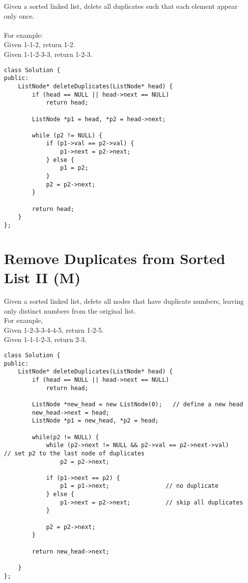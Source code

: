 Given a sorted linked list, delete all duplicates such that each element appear only once.\\ \\
For example: \\
Given 1-1-2, return 1-2. \\
Given 1-1-2-3-3, return 1-2-3. \\

\begin{lstlisting}
class Solution {
public:
    ListNode* deleteDuplicates(ListNode* head) {
        if (head == NULL || head->next == NULL)
            return head;
        
        ListNode *p1 = head, *p2 = head->next;
        
        while (p2 != NULL) {
            if (p1->val == p2->val) {
                p1->next = p2->next; 
            } else {
                p1 = p2;
            }
            p2 = p2->next;
        }
        
        return head;
    }
};
\end{lstlisting}


\section{Remove Duplicates from Sorted List II (M)}
Given a sorted linked list, delete all nodes that have duplicate numbers, leaving only distinct numbers from the original list.\\

For example,\\
Given 1-2-3-3-4-4-5, return 1-2-5.\\
Given 1-1-1-2-3, return 2-3. \\

\begin{lstlisting}
class Solution {
public:
    ListNode* deleteDuplicates(ListNode* head) {
        if (head == NULL || head->next == NULL)
            return head;
        
        ListNode *new_head = new ListNode(0);   // define a new head
        new_head->next = head;
        ListNode *p1 = new_head, *p2 = head;
        
        while(p2 != NULL) {
            while (p2->next != NULL && p2->val == p2->next->val)		// set p2 to the last node of duplicates
                p2 = p2->next;
            
            if (p1->next == p2) {
                p1 = p1->next;                // no duplicate
            } else {
                p1->next = p2->next;          // skip all duplicates
            }
            
            p2 = p2->next;
        }
        
        return new_head->next;
        
    }
};
\end{lstlisting}


